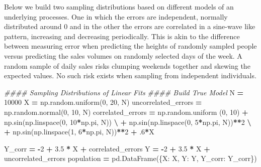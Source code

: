 \documentclass[
]{book}
\newenvironment{Shaded}{\begin{snugshade}}{\end{snugshade}}
\newcommand{\CommentTok}[1]{\textcolor[rgb]{0.56,0.35,0.01}{\textit{#1}}}
\newcommand{\DecValTok}[1]{\textcolor[rgb]{0.00,0.00,0.81}{#1}}
\newcommand{\FloatTok}[1]{\textcolor[rgb]{0.00,0.00,0.81}{#1}}
\newcommand{\NormalTok}[1]{#1}
\newcommand{\OperatorTok}[1]{\textcolor[rgb]{0.81,0.36,0.00}{\textbf{#1}}}
\newcommand{\StringTok}[1]{\textcolor[rgb]{0.31,0.60,0.02}{#1}}
\theoremstyle{definition}
\theoremstyle{definition}
\theoremstyle{definition}
\theoremstyle{remark}
\begin{document}
Below we build two sampling distributions based on different models of an underlying processes. One in which the errors are independent, normally distributed around \(0\) and in the other the errors are correlated in a sine-wave like pattern, increasing and decreasing periodically. This is akin to the difference between measuring error when predicting the heights of randomly sampled people versus predicting the sales volumes on randomly selected days of the week. A random sample of daily sales risks clumping weekends together and skewing the expected values. No such risk exists when sampling from independent individuals.

\begin{Shaded}
\begin{Highlighting}[]
\CommentTok{\#\#\#\# Sampling Distributions of Linear Fits}
\CommentTok{\#\#\#\# Build True Model}
\NormalTok{N }\OperatorTok{=} \DecValTok{10000}
\NormalTok{X }\OperatorTok{=}\NormalTok{ np.random.uniform(}\DecValTok{0}\NormalTok{, }\DecValTok{20}\NormalTok{, N)}
\NormalTok{uncorrelated\_errors }\OperatorTok{=}\NormalTok{ np.random.normal(}\DecValTok{0}\NormalTok{, }\DecValTok{10}\NormalTok{, N)}
\NormalTok{correlated\_errors }\OperatorTok{=}\NormalTok{ np.random.uniform (}\DecValTok{0}\NormalTok{, }\DecValTok{10}\NormalTok{) }\OperatorTok{+}\NormalTok{ np.sin(np.linspace(}\DecValTok{0}\NormalTok{, }\DecValTok{10}\OperatorTok{*}\NormalTok{np.pi, N)) }\OperatorTok{\textbackslash{}}
          \OperatorTok{+}\NormalTok{ np.sin(np.linspace(}\DecValTok{0}\NormalTok{, }\DecValTok{5}\OperatorTok{*}\NormalTok{np.pi, N))}\OperatorTok{**}\DecValTok{2} \OperatorTok{\textbackslash{}}
          \OperatorTok{+}\NormalTok{ np.sin(np.linspace(}\DecValTok{1}\NormalTok{, }\DecValTok{6}\OperatorTok{*}\NormalTok{np.pi, N))}\OperatorTok{**}\DecValTok{2} \OperatorTok{+} \FloatTok{.6}\OperatorTok{*}\NormalTok{X}

\NormalTok{Y\_corr }\OperatorTok{=} \OperatorTok{{-}}\DecValTok{2} \OperatorTok{+} \FloatTok{3.5} \OperatorTok{*}\NormalTok{ X }\OperatorTok{+}\NormalTok{ correlated\_errors}
\NormalTok{Y }\OperatorTok{=} \OperatorTok{{-}}\DecValTok{2} \OperatorTok{+} \FloatTok{3.5} \OperatorTok{*}\NormalTok{ X }\OperatorTok{+}\NormalTok{ uncorrelated\_errors}
\NormalTok{population }\OperatorTok{=}\NormalTok{ pd.DataFrame(\{}\StringTok{\textquotesingle{}X\textquotesingle{}}\NormalTok{: X, }\StringTok{\textquotesingle{}Y\textquotesingle{}}\NormalTok{: Y, }\StringTok{\textquotesingle{}Y\_corr\textquotesingle{}}\NormalTok{: Y\_corr\})}


\end{Highlighting}
\end{Shaded}
\end{document}
